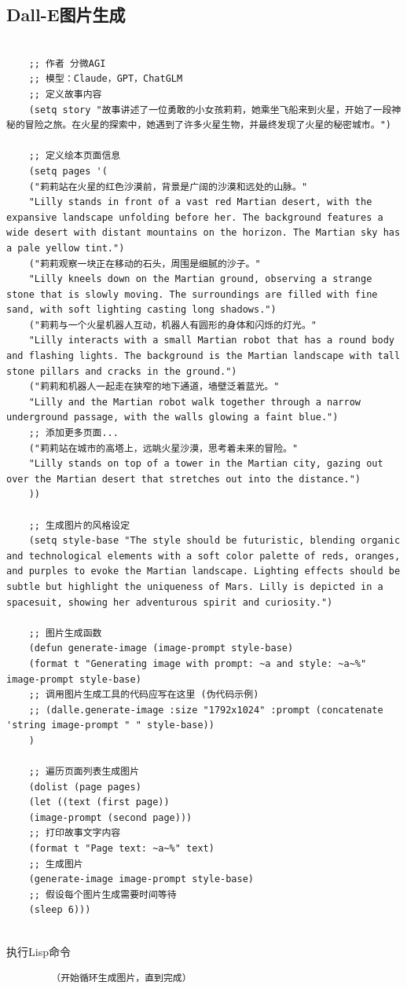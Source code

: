 \documentclass[12pt]{book}
\begin{document}
\subsection{Dall-E图片生成}
	\begin{lstlisting}
		
	;; 作者 分微AGI
	;; 模型：Claude，GPT，ChatGLM
	;; 定义故事内容
	(setq story "故事讲述了一位勇敢的小女孩莉莉，她乘坐飞船来到火星，开始了一段神秘的冒险之旅。在火星的探索中，她遇到了许多火星生物，并最终发现了火星的秘密城市。")
	
	;; 定义绘本页面信息
	(setq pages '(
	("莉莉站在火星的红色沙漠前，背景是广阔的沙漠和远处的山脉。" 
	"Lilly stands in front of a vast red Martian desert, with the expansive landscape unfolding before her. The background features a wide desert with distant mountains on the horizon. The Martian sky has a pale yellow tint.")
	("莉莉观察一块正在移动的石头，周围是细腻的沙子。" 
	"Lilly kneels down on the Martian ground, observing a strange stone that is slowly moving. The surroundings are filled with fine sand, with soft lighting casting long shadows.")
	("莉莉与一个火星机器人互动，机器人有圆形的身体和闪烁的灯光。" 
	"Lilly interacts with a small Martian robot that has a round body and flashing lights. The background is the Martian landscape with tall stone pillars and cracks in the ground.")
	("莉莉和机器人一起走在狭窄的地下通道，墙壁泛着蓝光。" 
	"Lilly and the Martian robot walk together through a narrow underground passage, with the walls glowing a faint blue.")
	;; 添加更多页面...
	("莉莉站在城市的高塔上，远眺火星沙漠，思考着未来的冒险。" 
	"Lilly stands on top of a tower in the Martian city, gazing out over the Martian desert that stretches out into the distance.")
	))
	
	;; 生成图片的风格设定
	(setq style-base "The style should be futuristic, blending organic and technological elements with a soft color palette of reds, oranges, and purples to evoke the Martian landscape. Lighting effects should be subtle but highlight the uniqueness of Mars. Lilly is depicted in a spacesuit, showing her adventurous spirit and curiosity.")
	
	;; 图片生成函数
	(defun generate-image (image-prompt style-base)
	(format t "Generating image with prompt: ~a and style: ~a~%" image-prompt style-base)
	;; 调用图片生成工具的代码应写在这里 (伪代码示例)
	;; (dalle.generate-image :size "1792x1024" :prompt (concatenate 'string image-prompt " " style-base))
	)
	
	;; 遍历页面列表生成图片
	(dolist (page pages)
	(let ((text (first page))
	(image-prompt (second page)))
	;; 打印故事文字内容
	(format t "Page text: ~a~%" text)
	;; 生成图片
	(generate-image image-prompt style-base)
	;; 假设每个图片生成需要时间等待
	(sleep 6)))
	
\end{lstlisting}
	执行Lisp命令
	\begin{lstlisting}
		（开始循环生成图片，直到完成）
	\end{lstlisting}
\end{document}
